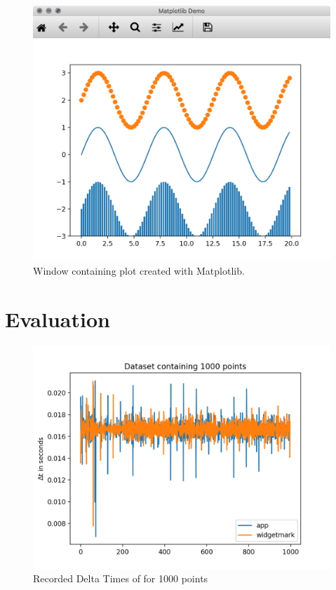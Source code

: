 \begin{figure}[h]
    \centering
    \includegraphics[width=14cm]{resources/img/MatplotlibDemo}
    \caption{Window containing plot created with Matplotlib.}
    \label{a:fig:matplotlib:window}
\end{figure}

\clearpage

\section{Evaluation}
\label{sec:appendix:evaluation}

\begin{figure}[h]
    \centering
    \includegraphics[width=12cm]{resources/img/evaluation/Eval_1000}
    \caption{
        Recorded Delta Times of for 1000 points
    }
    \label{a:tab:evaluation:1000}
\end{figure}


